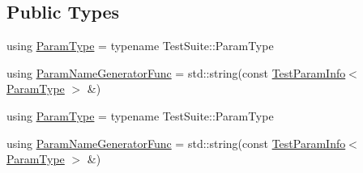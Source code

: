 \subsection*{Public Types}
\begin{DoxyCompactItemize}
\item 
using \mbox{\hyperlink{classtesting_1_1internal_1_1_parameterized_test_suite_info_a10761bd750a6820a8d8d2c654b10fe54}{Param\+Type}} = typename Test\+Suite\+::\+Param\+Type
\item 
using \mbox{\hyperlink{classtesting_1_1internal_1_1_parameterized_test_suite_info_a3b4f232b7d6d3df941bb8e81b6b534a4}{Param\+Name\+Generator\+Func}} = std\+::string(const \mbox{\hyperlink{structtesting_1_1_test_param_info}{Test\+Param\+Info}}$<$ \mbox{\hyperlink{classtesting_1_1internal_1_1_parameterized_test_suite_info_a10761bd750a6820a8d8d2c654b10fe54}{Param\+Type}} $>$ \&)
\item 
using \mbox{\hyperlink{classtesting_1_1internal_1_1_parameterized_test_suite_info_a10761bd750a6820a8d8d2c654b10fe54}{Param\+Type}} = typename Test\+Suite\+::\+Param\+Type
\item 
using \mbox{\hyperlink{classtesting_1_1internal_1_1_parameterized_test_suite_info_a3b4f232b7d6d3df941bb8e81b6b534a4}{Param\+Name\+Generator\+Func}} = std\+::string(const \mbox{\hyperlink{structtesting_1_1_test_param_info}{Test\+Param\+Info}}$<$ \mbox{\hyperlink{classtesting_1_1internal_1_1_parameterized_test_suite_info_a10761bd750a6820a8d8d2c654b10fe54}{Param\+Type}} $>$ \&)
\end{DoxyCompactItemize}
